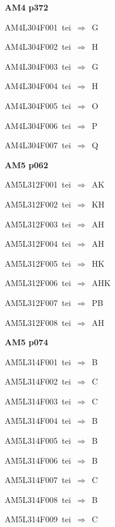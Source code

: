 \par\vfill\eject
{\bf\hfill AM4 p372\hfill\hbox{}}\par\bigskip
{\sixrm AM4L304F001\ {\sixit tei}\ }$\Rightarrow$\ G\par\smallskip
{\sixrm AM4L304F002\ {\sixit tei}\ }$\Rightarrow$\ H\par\smallskip
{\sixrm AM4L304F003\ {\sixit tei}\ }$\Rightarrow$\ G\par\smallskip
{\sixrm AM4L304F004\ {\sixit tei}\ }$\Rightarrow$\ H\par\smallskip
{\sixrm AM4L304F005\ {\sixit tei}\ }$\Rightarrow$\ O\par\smallskip
{\sixrm AM4L304F006\ {\sixit tei}\ }$\Rightarrow$\ P\par\smallskip
{\sixrm AM4L304F007\ {\sixit tei}\ }$\Rightarrow$\ Q\par\smallskip

\par\vfill\eject
{\bf\hfill AM5 p062\hfill\hbox{}}\par\bigskip
{\sixrm AM5L312F001\ {\sixit tei}\ }$\Rightarrow$\ AK\par\smallskip
{\sixrm AM5L312F002\ {\sixit tei}\ }$\Rightarrow$\ KH\par\smallskip
{\sixrm AM5L312F003\ {\sixit tei}\ }$\Rightarrow$\ AH\par\smallskip
{\sixrm AM5L312F004\ {\sixit tei}\ }$\Rightarrow$\ AH\par\smallskip
{\sixrm AM5L312F005\ {\sixit tei}\ }$\Rightarrow$\ HK\par\smallskip
{\sixrm AM5L312F006\ {\sixit tei}\ }$\Rightarrow$\ AHK\par\smallskip
{\sixrm AM5L312F007\ {\sixit tei}\ }$\Rightarrow$\ PB\par\smallskip
{\sixrm AM5L312F008\ {\sixit tei}\ }$\Rightarrow$\ AH\par\smallskip

\par\vfill\eject
{\bf\hfill AM5 p074\hfill\hbox{}}\par\bigskip
{\sixrm AM5L314F001\ {\sixit tei}\ }$\Rightarrow$\ B\par\smallskip
{\sixrm AM5L314F002\ {\sixit tei}\ }$\Rightarrow$\ C\par\smallskip
{\sixrm AM5L314F003\ {\sixit tei}\ }$\Rightarrow$\ C\par\smallskip
{\sixrm AM5L314F004\ {\sixit tei}\ }$\Rightarrow$\ B\par\smallskip
{\sixrm AM5L314F005\ {\sixit tei}\ }$\Rightarrow$\ B\par\smallskip
{\sixrm AM5L314F006\ {\sixit tei}\ }$\Rightarrow$\ B\par\smallskip
{\sixrm AM5L314F007\ {\sixit tei}\ }$\Rightarrow$\ C\par\smallskip
{\sixrm AM5L314F008\ {\sixit tei}\ }$\Rightarrow$\ B\par\smallskip
{\sixrm AM5L314F009\ {\sixit tei}\ }$\Rightarrow$\ C\par\smallskip

